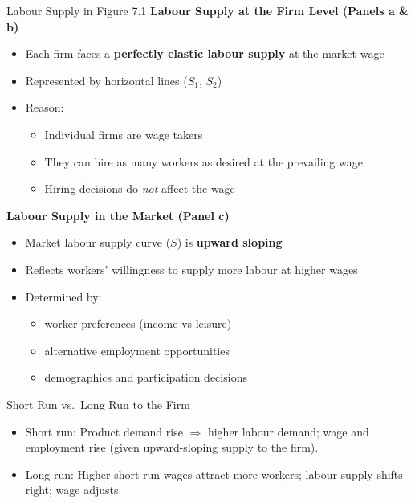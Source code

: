 \documentclass[aspectratio=169]{beamer}
\begin{document}
\begin{frame}{Labour Supply in Figure 7.1}
\textbf{Labour Supply at the Firm Level (Panels a \& b)}
\begin{itemize}
\item Each firm faces a \textbf{perfectly elastic labour supply} at the market wage
\item Represented by horizontal lines ($S_1$, $S_2$)
\item Reason:
\begin{itemize}
\item Individual firms are wage takers
\item They can hire as many workers as desired at the prevailing wage
\item Hiring decisions do \emph{not} affect the wage
\end{itemize}
\end{itemize}

\vspace{0.3cm}

\textbf{Labour Supply in the Market (Panel c)}
\begin{itemize}
\item Market labour supply curve ($S$) is \textbf{upward sloping}
\item Reflects workers’ willingness to supply more labour at higher wages
\item Determined by:
\begin{itemize}
\item worker preferences (income vs leisure)
\item alternative employment opportunities
\item demographics and participation decisions
\end{itemize}
\end{itemize}

\end{frame}


\begin{frame}{Short Run vs.\ Long Run to the Firm}
\transfade
\begin{itemize}[<+->]
  \item Short run: Product demand rise \(\Rightarrow\) higher labour demand; wage and employment rise (given upward-sloping supply to the firm).
  \item Long run: Higher short-run wages attract more workers; labour supply shifts right; wage adjusts.
\end{itemize}
\end{frame}
\end{document}
